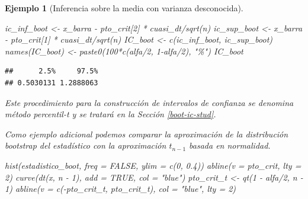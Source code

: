 \documentclass[
]{book}
\newenvironment{Shaded}{\begin{snugshade}}{\end{snugshade}}
\newcommand{\AttributeTok}[1]{\textcolor[rgb]{0.77,0.63,0.00}{#1}}
\newcommand{\ConstantTok}[1]{\textcolor[rgb]{0.00,0.00,0.00}{#1}}
\newcommand{\DecValTok}[1]{\textcolor[rgb]{0.00,0.00,0.81}{#1}}
\newcommand{\FloatTok}[1]{\textcolor[rgb]{0.00,0.00,0.81}{#1}}
\newcommand{\FunctionTok}[1]{\textcolor[rgb]{0.00,0.00,0.00}{#1}}
\newcommand{\NormalTok}[1]{#1}
\newcommand{\OtherTok}[1]{\textcolor[rgb]{0.56,0.35,0.01}{#1}}
\newcommand{\SpecialCharTok}[1]{\textcolor[rgb]{0.00,0.00,0.00}{#1}}
\newcommand{\StringTok}[1]{\textcolor[rgb]{0.31,0.60,0.02}{#1}}
\theoremstyle{break}
\newtheorem{example}{Ejemplo}[chapter]
\theoremstyle{nonumberplain}
\begin{document}
\begin{example}[Inferencia sobre la media con varianza desconocida]
\begin{Shaded}
\begin{Highlighting}[]
\NormalTok{ic\_inf\_boot }\OtherTok{\textless{}{-}}\NormalTok{ x\_barra }\SpecialCharTok{{-}}\NormalTok{ pto\_crit[}\DecValTok{2}\NormalTok{] }\SpecialCharTok{*}\NormalTok{ cuasi\_dt}\SpecialCharTok{/}\FunctionTok{sqrt}\NormalTok{(n)}
\NormalTok{ic\_sup\_boot }\OtherTok{\textless{}{-}}\NormalTok{ x\_barra }\SpecialCharTok{{-}}\NormalTok{ pto\_crit[}\DecValTok{1}\NormalTok{] }\SpecialCharTok{*}\NormalTok{ cuasi\_dt}\SpecialCharTok{/}\FunctionTok{sqrt}\NormalTok{(n)}
\NormalTok{IC\_boot }\OtherTok{\textless{}{-}} \FunctionTok{c}\NormalTok{(ic\_inf\_boot, ic\_sup\_boot)}
\FunctionTok{names}\NormalTok{(IC\_boot) }\OtherTok{\textless{}{-}} \FunctionTok{paste0}\NormalTok{(}\DecValTok{100}\SpecialCharTok{*}\FunctionTok{c}\NormalTok{(alfa}\SpecialCharTok{/}\DecValTok{2}\NormalTok{, }\DecValTok{1}\SpecialCharTok{{-}}\NormalTok{alfa}\SpecialCharTok{/}\DecValTok{2}\NormalTok{), }\StringTok{"\%"}\NormalTok{)}
\NormalTok{IC\_boot}
\end{Highlighting}
\end{Shaded}

\begin{verbatim}
##      2.5%     97.5% 
## 0.5030131 1.2888063
\end{verbatim}

Este procedimiento para la construcción de intervalos de confianza se denomina \emph{método percentil-t} y se tratará en la Sección \ref{boot-ic-stud}.

Como ejemplo adicional podemos comparar la aproximación de la distribución bootstrap del estadístico con la aproximación \(t_{n-1}\) basada en normalidad.

\begin{Shaded}
\begin{Highlighting}[]
\FunctionTok{hist}\NormalTok{(estadistico\_boot, }\AttributeTok{freq =} \ConstantTok{FALSE}\NormalTok{, }\AttributeTok{ylim =} \FunctionTok{c}\NormalTok{(}\DecValTok{0}\NormalTok{, }\FloatTok{0.4}\NormalTok{))}
\FunctionTok{abline}\NormalTok{(}\AttributeTok{v =}\NormalTok{ pto\_crit, }\AttributeTok{lty =} \DecValTok{2}\NormalTok{)}
\FunctionTok{curve}\NormalTok{(}\FunctionTok{dt}\NormalTok{(x, n }\SpecialCharTok{{-}} \DecValTok{1}\NormalTok{), }\AttributeTok{add =} \ConstantTok{TRUE}\NormalTok{, }\AttributeTok{col =} \StringTok{"blue"}\NormalTok{)}
\NormalTok{pto\_crit\_t }\OtherTok{\textless{}{-}} \FunctionTok{qt}\NormalTok{(}\DecValTok{1} \SpecialCharTok{{-}}\NormalTok{ alfa}\SpecialCharTok{/}\DecValTok{2}\NormalTok{, n }\SpecialCharTok{{-}} \DecValTok{1}\NormalTok{)}
\FunctionTok{abline}\NormalTok{(}\AttributeTok{v =} \FunctionTok{c}\NormalTok{(}\SpecialCharTok{{-}}\NormalTok{pto\_crit\_t, pto\_crit\_t), }\AttributeTok{col =} \StringTok{"blue"}\NormalTok{, }\AttributeTok{lty =} \DecValTok{2}\NormalTok{)}
\end{Highlighting}
\end{Shaded}


\end{example}
\end{document}

